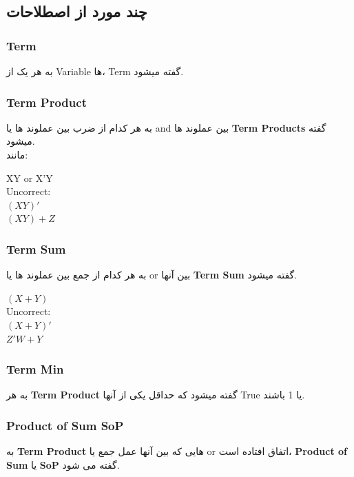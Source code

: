 \documentclass[pt, a5paper]{article}
\begin{document}
\raggedleft
\justifying

\subsection{چند مورد از اصطلاحات}

\subsubsection{Term}
به هر يک از Variable ها، Term گفته ميشود.

\subsubsection{Term Product}
به هر کدام از ضرب بین عملوند ها یا and بین عملوند ها
\textbf{ Term Products }گفته میشود.\\
مانند:\\

\raggedright
XY or X'Y\\
Uncorrect:\\
$(XY)'$\\
$(XY) + Z$\\

\raggedleft
\justifying
\subsubsection{Term Sum}
	به هر کدام از جمع بین عملوند ها یا or بین آنها	
\textbf{Term Sum}
گفته میشود.\\

\raggedright
$(X + Y)$\\
Uncorrect:\\
$(X+Y)'$\\
$Z'W + Y$\\

\raggedleft
\justifying
\subsubsection{Term Min}
	به هر \textbf{Term Product} گفته میشود که حداقل یکی از آنها True یا 1 باشند.

\raggedleft
\justifying
\subsubsection{Product of Sum SoP}
	به \textbf{Term Product }هایی که بین آنها عمل جمع یا or اتفاق افتاده است، \textbf{Product of Sum }یا \textbf{SoP} گفته می شود.\\
\end{document}
